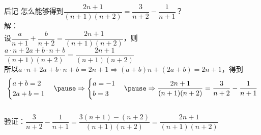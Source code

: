 \documentclass[aspectratio=169]{ctexbeamer} %
\begin{document}
\begin{frame}[t]{后记}
怎么能够得到$ \dfrac{2n+1}{(n+1)(n+2)} = \dfrac{3}{n+2} - \dfrac{1}{n+1} $？ \\
\pause
解：\\ 
设$\dfrac{a}{n+1} + \dfrac{b}{n+2} = \dfrac{2n+1}{(n+1)(n+2)} $，则$\dfrac{a \cdot n + 2a + b \cdot n+b}{(n+1)(n+2)} = \dfrac{2n+1}{(n+1)(n+2)} $ \\
\pause
所以$a \cdot n + 2a + b \cdot n + b = 2n + 1 \Rightarrow (a+b)n + (2a+b) = 2n + 1$，得到\\
\[
\begin{cases}
a + b = 2 \\
2a + b = 1
\end{cases}
\pause
\Rightarrow
\begin{cases}
a =  -1 \\
b = 3
\end{cases}
\pause
\Rightarrow
\dfrac{2n+1}{(n+1)(n+2)} = \dfrac{3}{n+2} - \dfrac{1}{n+1}
\] \\
验证：$\dfrac{3}{n+2} - \dfrac{1}{n+1} = \dfrac{3(n+1) - (n+2)}{(n+1)(n+2)} = \dfrac{2n+1}{(n+1)(n+2)}$
\end{frame}
\end{document}
